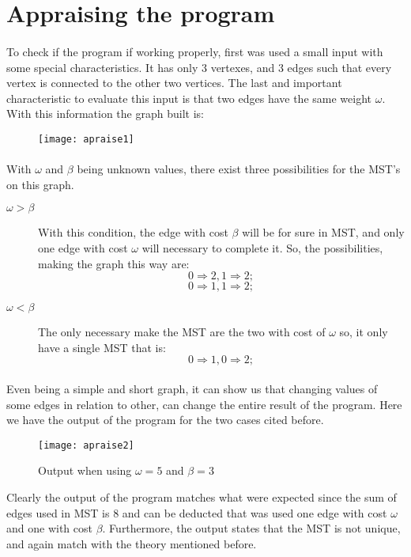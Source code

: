 \documentclass[titlepage]{article}
\begin{document}
    \section{Appraising the program}
    \paragraph{}
    To check if the program if working properly, first was used a small input with some special characteristics. It has only 3 vertexes, and 3 edges such that every vertex is connected to the other two vertices. The last and important characteristic to evaluate this input is that two edges have the same weight $\omega$. With this information the graph built is:
    \begin{figure}[h]
        \begin{center}
            \texttt{[image: apraise1]}
        \end{center}
    \end{figure}
    \paragraph{}
    With $\omega$ and $\beta$ being unknown values, there exist three possibilities for the MST's on this graph.
    \begin{description}
        \item[$\omega > \beta$] With this condition, the edge with cost $\beta$ will be for sure in MST, and only one edge with cost $\omega$ will necessary to complete it. So, the possibilities, making the graph this way are:
        $$
        0 \Rightarrow 2, 1 \Rightarrow 2;
        $$
        $$
        0 \Rightarrow 1, 1 \Rightarrow 2; 
        $$
        \item[$\omega < \beta$] The only necessary make the MST are the two with cost of $\omega$ so, it only have a single MST that is:
        $$
        0 \Rightarrow 1, 0 \Rightarrow 2;
        $$   
    \end{description}
    \paragraph{}
    Even being a simple and short graph, it can show us that changing values of some edges in relation to other, can change the entire result of the program. Here we have the output of the program for the two cases cited before.
    \begin{figure}[h]
        \begin{center}
            \texttt{[image: apraise2]}
            \caption{Output when using $\omega=5$ and $\beta=3$}
        \end{center}
    \end{figure}
    Clearly the output of the program matches what were expected since the sum of edges used in MST is 8 and can be deducted that was used one edge with cost $\omega$ and one with cost $\beta$. Furthermore, the output states that the MST is not unique, and again match with the theory mentioned before.
\end{document}
